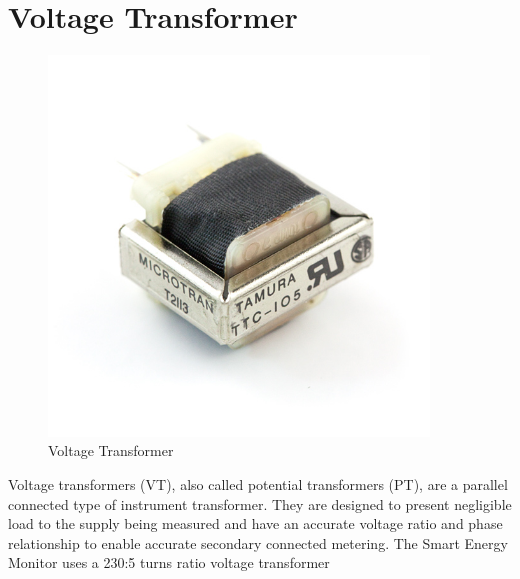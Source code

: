 \section{Voltage Transformer}{

\begin{figure}[H]
	\includegraphics[width=0.9\textwidth]{images/vt.jpg} %
	\caption{Voltage Transformer}
	\label{Voltage Transformer}
\end{figure}
Voltage transformers (VT), also called potential transformers (PT), are a parallel connected type of instrument transformer. They are designed to present negligible load to the supply being measured and have an accurate voltage ratio and phase relationship to enable accurate secondary connected metering.
The Smart Energy Monitor uses a 230:5 turns ratio voltage transformer 
}


